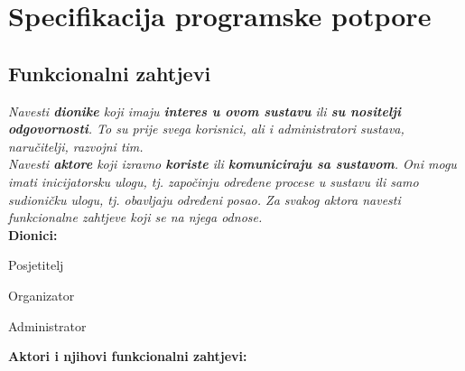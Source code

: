 \chapter{Specifikacija programske potpore}
		
			
		
	\section{Funkcionalni zahtjevi}
			
			
			
			\textit{Navesti \textbf{dionike} koji imaju \textbf{interes u ovom sustavu} ili  \textbf{su nositelji odgovornosti}. To su prije svega korisnici, ali i administratori sustava, naručitelji, razvojni tim.}\\
				
			\textit{Navesti \textbf{aktore} koji izravno \textbf{koriste} ili \textbf{komuniciraju sa sustavom}. Oni mogu imati inicijatorsku ulogu, tj. započinju određene procese u sustavu ili samo sudioničku ulogu, tj. obavljaju određeni posao. Za svakog aktora navesti funkcionalne zahtjeve koji se na njega odnose.}\\
			
			
			\noindent \textbf{Dionici:}
			
			\begin{packed_enum}
				
				\item Posjetitelj
				\item Organizator			
				\item Administrator
				
			\end{packed_enum}
			
			\noindent \textbf{Aktori i njihovi funkcionalni zahtjevi:}
			
